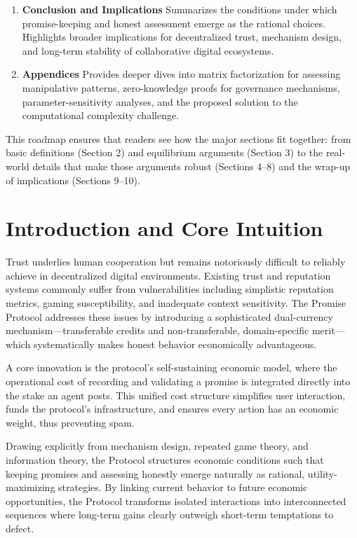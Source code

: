 \documentclass[11pt]{article}
\begin{document}
\begin{enumerate}
\item \textbf{Conclusion and Implications}
Summarizes the conditions under which promise-keeping and honest assessment emerge
as the rational choices. Highlights broader implications for decentralized trust,
mechanism design, and long-term stability of collaborative digital ecosystems.

\item \textbf{Appendices}
Provides deeper dives into matrix factorization for assessing manipulative patterns,
zero-knowledge proofs for governance mechanisms, parameter-sensitivity analyses,
and the proposed solution to the computational complexity challenge.
\end{enumerate}

This roadmap ensures that readers see how the major sections fit together: from basic definitions (Section 2) and equilibrium arguments (Section 3) to the real-world details that make those arguments robust (Sections 4–8) and the wrap-up of implications (Sections 9–10).
\section{Introduction and Core Intuition}
\label{sec:org19c174c}

Trust underlies human cooperation but remains notoriously difficult to reliably achieve in decentralized digital environments. Existing trust and reputation systems commonly suffer from vulnerabilities including simplistic reputation metrics, gaming susceptibility, and inadequate context sensitivity. The Promise Protocol addresses these issues by introducing a sophisticated dual-currency mechanism—transferable credits and non-transferable, domain-specific merit—which systematically makes honest behavior economically advantageous.

A core innovation is the protocol's self-sustaining economic model, where the operational cost of recording and validating a promise is integrated directly into the stake an agent posts. This unified cost structure simplifies user interaction, funds the protocol's infrastructure, and ensures every action has an economic weight, thus preventing spam.

Drawing explicitly from mechanism design, repeated game theory, and information theory, the Protocol structures economic conditions such that keeping promises and assessing honestly emerge naturally as rational, utility-maximizing strategies. By linking current behavior to future economic opportunities, the Protocol transforms isolated interactions into interconnected sequences where long-term gains clearly outweigh short-term temptations to defect.
\end{document}

